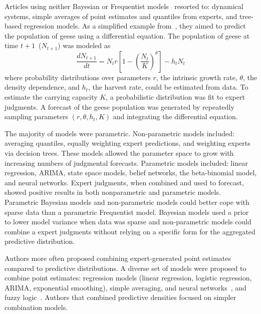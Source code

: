\documentclass[preprint,authoryear]{elsarticle}
\def\l{\left}
\def\r{\right}
\newcommand{\f}{\frac}
\begin{document}
Articles using neither Bayesian or Frequentist models~\citep{johnson2018making,li2012preliminary,petrovic2006fuzzy,song2013combining,graefe2014accuracy,morgan2014use,cai2016simple,kabak2008aggregating,graefe2015accuracy,graefe2018predicting,failing2004using,ren2002optimal,hora2013median,baron2014two} resorted to: dynamical systems, simple averages of point estimates and quantiles from experts, and tree-based regression models.
As a simplified example from~\cite{johnson2018making}, they aimed to predict the population of geese using a differential equation.
The population of geese at time $t+1$~($N_{t+1}$) was modeled as
\begin{equation*}
  \f{d N_{t+1}}{dt} = N_{t}r\l[ 1 - \l(\f{N_{t}}{K}\r)^{\theta} \r] - h_{t}N_{t}
\end{equation*}
where probability distributions over parameters $r$, the intrinsic growth rate, $\theta$, the density dependence, and $h_{t}$, the harvest rate, could be estimated from data.
To estimate the carrying capacity $K$, a probabilistic distribution was fit to expert judgments.
A forecast of the geese population was generated by repeatedly sampling parameters $(r,\theta,h_{t},K)$ and integrating the differential equation.

The majority of models were parametric.
Non-parametric models included: averaging quantiles, equally weighting expert predictions, and weighting experts via decision trees.
These models allowed the parameter space to grow with increasing numbers of judgmental forecasts.
Parametric models included: linear regression, ARIMA, state space models, belief networks, the beta-binomial model, and neural networks.
Expert judgments, when combined and used to forecast, showed positive results in both nonparametric and parametric models.
Parametric Bayesian models and non-parametric models could better cope with sparse data than a parametric Frequentist model.
Bayesian models used a prior to lower model variance when data was sparse and non-parametric models could combine a expert judgments without relying on a specific form for the aggregated predictive distribution.

Authors more often proposed combining expert-generated point estimates compared to predictive distributions.
A diverse set of models were proposed to combine point estimates: regression models (linear regression, logistic regression, ARIMA, exponential smoothing), simple averaging, and neural networks~\citep{cabello2012combination,adams2009acceptability,mak1996aggregating,graefe2014combining,baron2014two}, and fuzzy logic~\cite{petrovic2006fuzzy,kabak2008aggregating,jana2019interval,ren2002optimal}.
Authors that combined predictive densities focused on simpler combination models.
\end{document}
